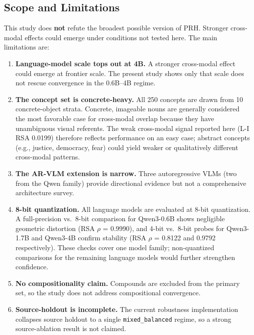 \documentclass[11pt,a4paper]{article}
\providecommand{\tightlist}{%
  \setlength{\itemsep}{0pt}\setlength{\parskip}{0pt}}
\begin{document}
\subsection{Scope and Limitations}\label{scope-and-limitations}

This study does \textbf{not} refute the broadest possible version of
PRH. Stronger cross-modal effects could emerge under conditions not
tested here. The main limitations are:

\begin{enumerate}
\def\labelenumi{\arabic{enumi}.}
\tightlist
\item
  \textbf{Language-model scale tops out at 4B.} A stronger cross-modal
  effect could emerge at frontier scale. The present study shows only
  that scale does not rescue convergence in the 0.6B--4B regime.
\item
  \textbf{The concept set is concrete-heavy.} All 250 concepts are drawn
  from 10 concrete-object strata. Concrete, imageable nouns are
  generally considered the most favorable case for cross-modal overlap
  because they have unambiguous visual referents. The weak cross-modal
  signal reported here (L-I RSA 0.0199) therefore reflects performance
  on an easy case; abstract concepts (e.g., justice, democracy, fear)
  could yield weaker or qualitatively different cross-modal patterns.
\item
  \textbf{The AR-VLM extension is narrow.} Three autoregressive VLMs
  (two from the Qwen family) provide directional evidence but not a
  comprehensive architecture survey.
\item
  \textbf{8-bit quantization.} All language models are evaluated at
  8-bit quantization. A full-precision vs.~8-bit comparison for
  Qwen3-0.6B shows negligible geometric distortion (RSA \(\rho\) =
  0.9990), and 4-bit vs.~8-bit probes for Qwen3-1.7B and Qwen3-4B
  confirm stability (RSA \(\rho\) = 0.8122 and 0.9792 respectively).
  These checks cover one model family; non-quantized comparisons for the
  remaining language models would further strengthen confidence.
\item
  \textbf{No compositionality claim.} Compounds are excluded from the
  primary set, so the study does not address compositional convergence.
\item
  \textbf{Source-holdout is incomplete.} The current robustness
  implementation collapses source holdout to a single
  \texttt{mixed\_balanced} regime, so a strong source-ablation result is
  not claimed.
\end{enumerate}
\end{document}
